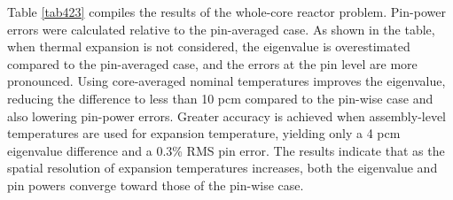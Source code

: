 Table \ref{tab423} compiles the results of the whole-core reactor problem. Pin-power errors were calculated relative to the pin-averaged case. As shown in the table, when thermal expansion is not considered, the eigenvalue is overestimated compared to the pin-averaged case, and the errors at the pin level are more pronounced. Using core-averaged nominal temperatures improves the eigenvalue, reducing the difference to less than 10 pcm compared to the pin-wise case and also lowering pin-power errors. Greater accuracy is achieved when assembly-level temperatures are used for expansion temperature, yielding only a 4 pcm eigenvalue difference and a 0.3\% RMS pin error. The results indicate that as the spatial resolution of expansion temperatures increases, both the eigenvalue and pin powers converge toward those of the pin-wise case.

